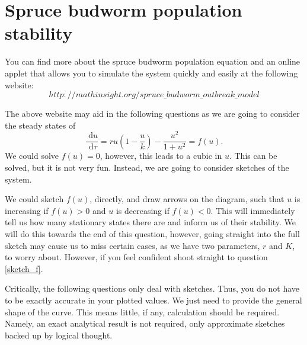 \documentclass[]{article}
\newcommand{\bb}{\begin{equation}}
\newcommand{\ee}{\end{equation}}
\newcommand{\rd}{\text{ d}}
\renewcommand{\l}{\left(}
\renewcommand{\r}{\right)}
\begin{document}
\section{Spruce budworm population stability}
You can find more about the spruce budworm population equation and an online applet that allows you to simulate the system quickly and easily at the following website:
\bb
http://mathinsight.org/spruce\_budworm\_outbreak\_model
\ee

The above website may aid in the following questions as we are going to consider the steady states of
\bb
\frac{\rd u}{\rd \tau}=ru\l 1-\frac{u}{k}\r-\frac{u^2}{1+u^2}=f(u).\label{Spruce}
\ee
We could solve $f(u)=0$, however, this leads to a cubic in $u$. This can be solved, but it is not very fun. Instead, we are going to consider sketches of the system. 

We could sketch $f(u)$, directly, and draw arrows on the diagram, such that $u$ is increasing if $f(u)>0$ and $u$ is decreasing if $f(u)<0$. This will immediately tell us how many stationary states there are and inform us of their stability. We will do this towards the end of this question, however, going straight into the full sketch may cause us to miss certain cases, as we have two parameters, $r$ and $K$, to worry about. However, if you feel confident shoot straight to question \ref{sketch_f}.

Critically, the following questions only deal with sketches. Thus, you do not have to be exactly accurate in your plotted values. We just need to provide the general shape of the curve. This means little, if any, calculation should be required. Namely, an exact analytical result is not required, only approximate sketches backed up by logical thought.
\end{document}
